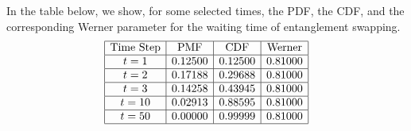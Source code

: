 \documentclass{masterthesis}
\begin{document}
In the table below, we show, for some selected times, the PDF, the CDF, and the corresponding Werner parameter for the waiting time of entanglement swapping.
\begin{equation*}
    \begin{array}{|c|c|c|c|}
        \hline
        \text{Time Step} & \text{PMF} & \text{CDF} & \text{Werner} \\
        \hline
        t = 1 & 0.12500 & 0.12500 & 0.81000 \\
        \hline
        t = 2 & 0.17188 & 0.29688 & 0.81000 \\
        \hline
        t = 3 & 0.14258 & 0.43945 & 0.81000 \\
        \hline
        t = 10 & 0.02913 & 0.88595 & 0.81000 \\
        \hline
        t = 50 & 0.00000 & 0.99999 & 0.81000 \\
        \hline
    \end{array}
\end{equation*}


{\raggedright\printbibliography}
\end{document}
